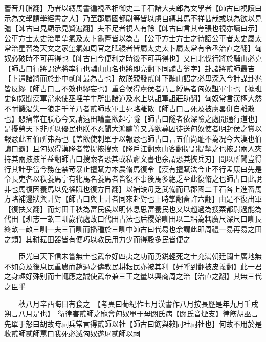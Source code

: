 蓍音升脂翻】乃者以縳馬書徧視丞相御史二千石諸大夫郎為文學者【師古曰視讀曰示為文學謂學經書之人】乃至郡屬國都尉等皆以虜自縛其馬不祥甚哉或以為欲以見彊【師古曰見顯示見賢遍翻】夫不足者視人有餘【師古曰言其夸張也視亦讀曰示】公車方士太史治星望氣及太卜龜蓍皆以為吉【公車方士方士之待詔公車者太史屬太常治星習為天文之家望氣如周官之㫝祲者皆屬太史太卜屬太常有令丞治直之翻】匈奴必破時不可再得也【師古曰今便利之時後不可再得也】又曰北伐行將於鬴山必克【師古曰行將謂遣將率行也鬴山山名也將即亮翻下同鬴古釡字】卦諸將貳師最吉【卜遣諸將而於卦中貳師最為吉也】故朕親發貳師下鬴山詔之必毋深入今計謀卦兆皆反繆【師古曰言不效也繆妄也】重合候得虜侯者乃言縛馬者匈奴詛軍事也【據班史匈奴聞漢軍當來使巫埋羊牛所出諸道及水上以詛軍詛莊助翻】匈奴常言漢極大然不耐饑渴失一狼走千羊乃者貳師敗軍士死略離散【師古曰言死及被虜畧併自離散也】悲痛常在朕心今又請遠田輪臺欲起亭隧【師古曰隧者依深險之處開通行道也】是擾勞天下非所以優民也朕不忍聞大鴻臚等又議欲募囚徒送匈奴使者明封侯之賞以報忿此五伯所弗為也【盖欲使刺單于以報忿也師古曰言五伯尚耻不為况今大漢也伯讀曰霸】且匈奴得漢降者常提掖搜索【降戶江翻索山客翻提謂提挈之也掖謂兩人夾持其兩掖掖羊益翻師古曰搜索者恐其或私齎文書也余謂恐其挾兵刃】問以所聞豈得行其計乎當今務在禁苛暴止擅賦力本農脩馬復令【漢有擅賦法今止不行孟康曰先是令長吏各以秩養馬亭有牝馬名養馬者皆復不事後馬多絶乏至此復脩之也師古曰此說非也馬復因養馬以免徭賦也復方目翻】以補缺毋乏武備而已郡國二千石各上進畜馬方略補邊狀與計對【師古曰與上計者同來赴對也上時掌翻畜許六翻】由是不復出軍【復扶又翻】而封田千秋為富民侯以明休息思富養民也又以趙過為搜粟都尉過能為代田【班志一畝三甽歲代處故曰代田古法也后稷始甽田以二耜為耦廣尺深尺曰甽長終畝一畝三甽一夫三百甽而播種於三甽中師古曰代易也余謂此即周禮一易再易之田之類】其耕耘田器皆有便巧以教民用力少而得穀多民皆便之

　　臣光曰天下信未嘗無士也武帝好四夷之功而勇鋭輕死之士充滿朝廷闢土廣地無不如意及後息民重農而趙過之儔教民耕耘民亦被其利【好呼到翻被皮義翻】此一君之身趣好殊别而士輒應之誠使武帝兼三王之量以興商周之治【治直之翻】其無三代之臣乎

　　秋八月辛酉晦日有食之　【考異曰荀紀作七月漢書作八月按長歷是年九月壬戌朔言八月是也】　衛律害貳師之寵會匈奴單于母閼氏病【閼氏音煙支】律飭胡巫言先單于怒曰胡故時祠兵常言得貳師以社【師古曰飭與敕同社祠社也】何故不用於是收貳師貳師罵曰我死必滅匈奴遂屠貳師以祠

